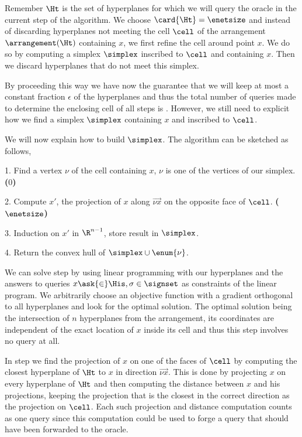 Remember \(\Ht\) is the set of hyperplanes for which we will query the oracle
in the current step of the algorithm. We choose \(\card{\Ht} = \enetsize\) and
instead of discarding hyperplanes not meeting the cell $\cell$ of the
arrangement $\arrangement(\Ht)$ containing $x$, we first refine the cell around
point $x$. We do so by computing a simplex $\simplex$ inscribed to $\cell$ and
containing \(x\). Then we discard hyperplanes that do not meet this simplex.

By proceeding this way we have now the guarantee that we will keep at most a
constant fraction \(\epsilon\) of the hyperplanes and thus the total number of
queries made to determine the enclosing cell of
all steps is . However, we
still need to explicit how we find a simplex $\simplex$ containing $x$ and
inscribed to $\cell$.

We will now explain how to build $\simplex$. The algorithm can be sketched as
follows,

\begin{algorithm}
\item[1.] Find a vertex $\nu$ of the cell containing $x$, $\nu$ is one of
the vertices of our simplex. \textbf{($0$)}
\item[2.] Compute $x'$, the projection of $x$ along $\vec{\nu x}$ on the
opposite face of $\cell$. \textbf{($\enetsize$)}
\item[3.] Induction on $x'$ in $\R^{n-1}$, store result in \(\simplex\).
\item[4.] Return the convex hull of \(\simplex \cup \enum{\nu}\).
\end{algorithm}

We can solve step  by using linear programming with our  hyperplanes and the answers to queries $x \ask{\in} \His, \sigma \in
\signset$ as constraints of the linear program. We arbitrarily choose an
objective function with a gradient orthogonal to all hyperplanes and look for
the optimal solution. The optimal solution being the intersection of \(n\)
hyperplanes from the arrangement, its coordinates are independent of the exact
location of \(x\) inside its cell and thus this step involves no query at all.

In step  we find the projection of $x$ on one of the faces of
$\cell$ by computing the closest hyperplane of $\Ht$ to $x$ in direction
$\vec{\nu x}$. This is done by projecting $x$ on every hyperplane of $\Ht$ and
then computing the distance between $x$ and his projections, keeping the
projection that is the closest in the correct direction as the projection
on $\cell$. Each such projection and distance computation counts as one query
since this computation could be used to forge a query that should have been
forwarded to the oracle.

